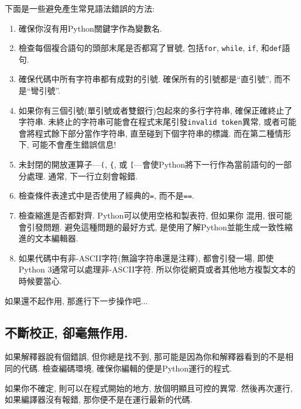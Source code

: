 \documentclass[10pt]{book}
\begin{document}
下面是一些避免產生常見語法錯誤的方法:

\begin{enumerate}

\item 確保你沒有用Python關鍵字作為變數名. 

\item 檢查每個複合語句的頭部末尾是否都寫了冒號, 包括{\tt for}, {\tt while},
{\tt if}, 和{\tt def}語句. 

\item 確保代碼中所有字符串都有成對的引號. 確保所有的引號都是``直引號'', 而不是``彎引號''. 

\item 如果你有三個引號(單引號或者雙銀行)包起來的多行字符串, 確保正確終止了字符串. 
未終止的字符串可能會在程式末尾引發{\tt invalid token}異常, 
或者可能會將程式餘下部分當作字符串, 直至碰到下個字符串的標識. 
而在第二種情形下, 可能不會產生錯誤信息!

\item 未封閉的開放運算子---\verb+(+, \verb+{+, 或
\verb+[+---會使Python將下一行作為當前語句的一部分處理. 
通常, 下一行立刻會報錯. 

\item 檢查條件表達式中是否使用了經典的{\tt =}, 而不是{\tt ==}.

\item 檢查縮進是否都對齊. Python可以使用空格和製表符, 但如果你
混用, 很可能會引發問題. 
避免這種問題的最好方式, 是使用了解Python並能生成一致性縮進的文本編輯器. 

\item 如果代碼中有非-ASCII字符(無論字符串還是注釋), 都會引發一場, 
即使Python 3通常可以處理非-ASCII字符. 
所以你從網頁或者其他地方複製文本的時候要當心. 

\end{enumerate}

如果還不起作用, 那進行下一步操作吧...


\subsection{不斷校正, 卻毫無作用.}

如果解釋器說有個錯誤, 但你總是找不到, 
那可能是因為你和解釋器看到的不是相同的代碼. 
檢查編碼環境, 確保你編輯的便是Python運行的程式. 

如果你不確定, 則可以在程式開始的地方, 放個明顯且可控的異常. 
然後再次運行, 如果編譯器沒有報錯, 那你便不是在運行最新的代碼. 
\end{document}
